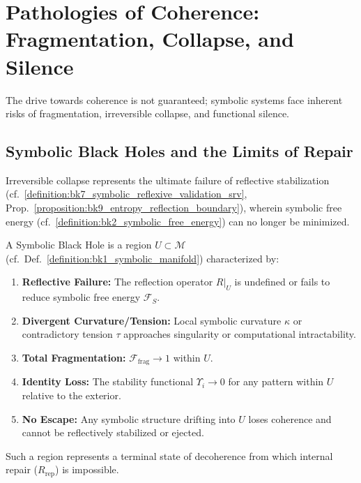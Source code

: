 \section{Pathologies of Coherence: Fragmentation, Collapse, and Silence}
\label{sec:bk9_pathologies_of_coherence}
The drive towards coherence is not guaranteed; symbolic systems face inherent risks of fragmentation, irreversible collapse, and functional silence.
\subsection{Symbolic Black Holes and the Limits of Repair}
\label{subsec:bk9_limits_of_repair}
Irreversible collapse represents the ultimate failure of reflective stabilization (cf.~\ref{definition:bk7_symbolic_reflexive_validation_srv}, Prop.~\ref{proposition:bk9_entropy_reflection_boundary}), wherein symbolic free energy (cf.~\ref{definition:bk2_symbolic_free_energy}) can no longer be minimized.
\begin{definition}
\label{definition:bk9_symbolic_black_hole}
A Symbolic Black Hole is a region $U \subset \mathcal{M}$ (cf.~Def.~\ref{definition:bk1_symbolic_manifold}) characterized by:
\begin{enumerate}
    \item \textbf{Reflective Failure:} The reflection operator $R|_U$ is undefined or fails to reduce symbolic free energy $\mathcal{F}_S$.
    \item \textbf{Divergent Curvature/Tension:} Local symbolic curvature $\kappa$ or contradictory tension $\tau$ approaches singularity or computational intractability.
    \item \textbf{Total Fragmentation:} $\mathcal{F}_{\text{frag}} \to 1$ within $U$.
    \item \textbf{Identity Loss:} The stability functional $\Upsilon_i \to 0$ for any pattern within $U$ relative to the exterior.
    \item \textbf{No Escape:} Any symbolic structure drifting into $U$ loses coherence and cannot be reflectively stabilized or ejected.
\end{enumerate}
Such a region represents a terminal state of decoherence from which internal repair ($R_{\text{rep}}$) is impossible.
\end{definition}
